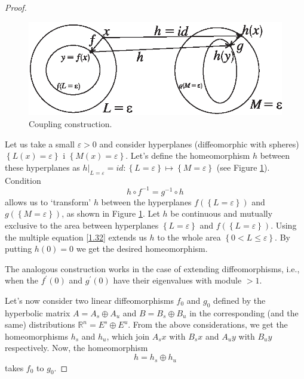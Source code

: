 \begin{proposition}
\begin{proof}
		\begin{figure}[!ht]
			\centering
			\includegraphics [scale=1.1]{jtr18}
			\caption{Coupling construction.}
			\label{fig:1.8}
		\end{figure}	
	Let us take a small $ \varepsilon> 0 $ and consider hyperplanes (diffeomorphic with spheres) $ \left \{L (x) = \varepsilon \right \} $ i $ \left \{M (x) = \varepsilon \right \} $. Let's define the homeomorphism $ h $ between these hyperplanes as $ h|_{L = \varepsilon} = id: \left \{L = \varepsilon \right \} \longmapsto \left \{M = \varepsilon \right \} $ (see Figure \ref{fig:1.8}). Condition 
	\begin{equation}
	\label{1.32}
	h\circ f^{-1}=g^{-1}\circ h
	\end{equation}
	allows us to `transform' $ h $ between the hyperplanes $f(\left\{ L=\varepsilon \right\} )$ and $g\left( \left\{ M=\varepsilon \right\} \right)$, as shown in Figure \ref{fig:1.8}. Let $ h $ be continuous and mutually exclusive to the area between hyperplanes $ \left \{L = \varepsilon \right \} $ and $ f \left (\left \{L = \varepsilon \right \} \right ) $. Using the multiple equation \eqref{1.32} extends us $ h $ to the whole area $ \left \{0 <L \leq \varepsilon \right \} $. By putting $ h (0) = 0 $ we get the desired homeomorphism.
	
	The analogous construction works in the case of extending diffeomorphisms, i.e., when the $ f ^ {\prime} (0) $ and $ g ^ {\prime} (0) $ have their eigenvalues with module $> 1 $.
	
	Let's now consider two linear diffeomorphisms $ f_ {0} $ and $ g_ {0} $ defined by the hyperbolic matrix $ A = A_ {s} \oplus A_ {u} $ and $ B = B_ {s} \oplus B_ {u}$ in the corresponding (and the same) distributions $ \mathbb {R} ^ {n} = E ^ {s} \oplus E ^ {u} $. From the above considerations, we get the homeomorphisms $ h_ {s} $ and $ h_ {u} $, which join $ A_ {s} x $  with $ B_ {s} x $  and $ A_ {u} y $ with  $ B_ {u} y $ respectively. Now, the homeomorphism 
	$$
	h=h_{s}\oplus h_{u}
	$$
	takes $ f_ {0} $ to $ g_ {0}$.
	

\end{proof}
\end{proposition}
